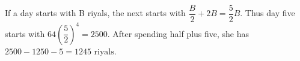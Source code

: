 If a day starts with B riyals, the next starts with $\dfrac{B}{2}+2B=\dfrac{5}{2}B$. Thus day five starts with $64(\dfrac{5}{2})^4=2500$. After spending half plus five, she has $2500-1250-5=\boxed{1245\text{ riyals}}$.
